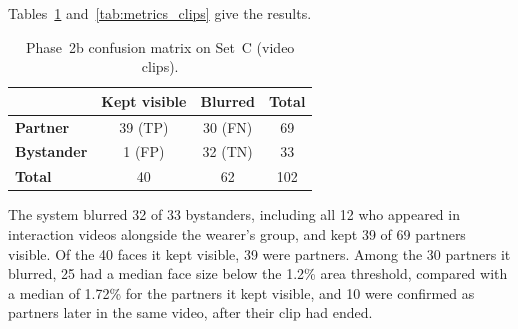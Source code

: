 Tables~\ref{tab:confusion_clips} and~\ref{tab:metrics_clips} give the results.

\begin{table}[htbp]
\begin{singlespace}
\centering
\caption{Phase~2b confusion matrix on Set~C (video clips).}
\label{tab:confusion_clips}
\renewcommand{\arraystretch}{1.3}
\begin{tabular}{@{}lccc@{}}
\toprule
 & \textbf{Kept visible} & \textbf{Blurred} & \textbf{Total} \\
\midrule
\textbf{Partner}   & 39 (TP) & 30 (FN) & 69 \\
\textbf{Bystander} & 1 (FP)  & 32 (TN) & 33 \\
\textbf{Total}     & 40      & 62      & 102 \\
\bottomrule
\end{tabular}
\end{singlespace}
\end{table}

\begin{table}[htbp]
\begin{singlespace}
\centering
\caption{Phase~2b metrics on Set~C with 95\% Wilson intervals. IPR, precision and F$_1$
are not defined for bystander videos, which contain no partners.}
\label{tab:metrics_clips}
\renewcommand{\arraystretch}{1.3}
\end{singlespace}
\end{table}

The system blurred 32 of 33 bystanders, including all 12 who appeared in interaction
videos alongside the wearer's group, and kept 39 of 69 partners visible. Of the 40 faces
it kept visible, 39 were partners. Among the 30 partners it blurred, 25 had a median face
size below the 1.2\% area threshold, compared with a median of 1.72\% for the partners it
kept visible, and 10 were confirmed as partners later in the same video, after their clip
had ended.


